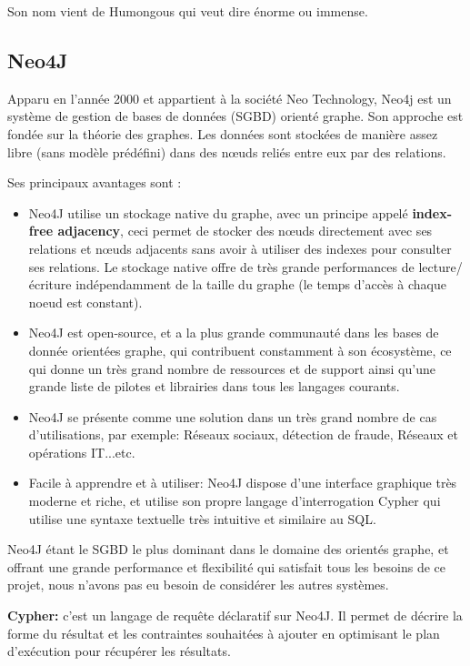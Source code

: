 Son nom vient de Humongous qui veut dire énorme ou immense.

\subsection{Neo4J}
Apparu en l'année 2000 et appartient à la société Neo Technology, Neo4j est un système de gestion de bases de données (SGBD) orienté graphe. Son approche est fondée sur la théorie des graphes. Les données sont stockées de manière assez libre (sans modèle prédéfini) dans des nœuds reliés entre eux par des relations.

Ses principaux avantages sont :
\begin{itemize}
	\item Neo4J utilise un stockage native du graphe, avec un principe appelé \textbf{index-free adjacency}, ceci permet de stocker des nœuds directement avec ses relations et nœuds adjacents sans avoir à utiliser des indexes pour consulter ses relations.\newline
	Le stockage native offre de très grande performances de lecture/écriture indépendamment de la taille du graphe (le temps d'accès à chaque noeud est constant).
	\item Neo4J est open-source, et a la plus grande communauté dans les bases de donnée orientées graphe, qui contribuent constamment à son écosystème, ce qui donne un très grand nombre de ressources et de support ainsi qu'une grande liste de pilotes et librairies dans tous les langages courants.
	\item Neo4J se présente comme une solution dans un très grand nombre de cas d'utilisations, par exemple: Réseaux sociaux, détection de fraude, Réseaux et opérations IT...etc.
	\item Facile à apprendre et à utiliser: Neo4J dispose d'une interface graphique très moderne et riche, et utilise son propre langage d'interrogation Cypher qui utilise une syntaxe textuelle très intuitive et similaire au SQL.
\end{itemize}

Neo4J étant le SGBD le plus dominant dans le domaine des orientés graphe, et offrant une grande performance et flexibilité qui satisfait tous les besoins de ce projet, nous n'avons pas eu besoin de considérer les autres systèmes.

\textbf{Cypher: } c'est un langage de requête déclaratif sur Neo4J. Il permet de décrire la forme du résultat et les contraintes souhaitées à ajouter en optimisant le plan d'exécution pour récupérer les résultats.\newline

